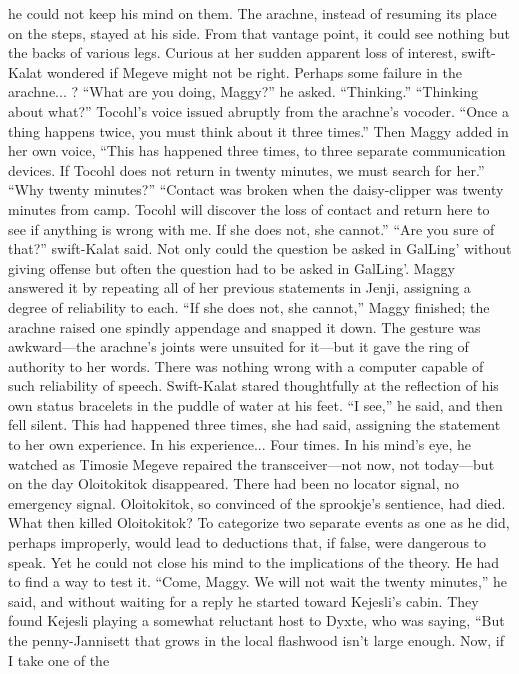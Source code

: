 \documentclass[9pt]{article}
\begin{document}
he could not keep his mind on them. The arachne, instead of resuming its place on the steps, stayed at his
side. From that vantage point, it could see nothing but the backs of various legs.
Curious at her sudden apparent loss of interest, swift-Kalat wondered if Megeve might not be right.
Perhaps some failure in the arachne... ? “What are you doing, Maggy?” he asked.
“Thinking.”
“Thinking about what?”
Tocohl’s voice issued abruptly from the arachne’s vocoder. “Once a thing happens twice, you must
think about it three times.” Then Maggy added in her own voice, “This has happened three times, to
three separate communication devices. If Tocohl does not return in twenty minutes, we must search for
her.”
“Why twenty minutes?”
“Contact was broken when the daisy-clipper was twenty minutes from camp. Tocohl will discover
the loss of contact and return here to see if anything is wrong with me. If she does not, she cannot.”
“Are you sure of that?” swift-Kalat said. Not only could the question be asked in GalLing’ without
giving offense but often the question had to be asked in GalLing’.
Maggy answered it by repeating all of her previous statements in Jenji, assigning a degree of reliability
to each. “If she does not, she cannot,” Maggy finished; the arachne raised one spindly appendage and
snapped it down.
The gesture was awkward—the arachne’s joints were unsuited for it—but it gave the ring of
authority to her words. There was nothing wrong with a computer capable of such reliability of speech.
Swift-Kalat stared thoughtfully at the reflection of his own status bracelets in the puddle of water at
his feet. “I see,” he said, and then fell silent. This had happened three times, she had said, assigning the
statement to her own experience. In his experience...
Four times. In his mind’s eye, he watched as Timosie Megeve repaired the transceiver—not now,
not today—but on the day Oloitokitok disappeared. There had been no locator signal, no emergency
signal. Oloitokitok, so convinced of the sprookje’s sentience, had died. What then killed Oloitokitok?
To categorize two separate events as one as he did, perhaps improperly, would lead to deductions
that, if false, were dangerous to speak. Yet he could not close his mind to the implications of the theory.
He had to find a way to test it.
“Come, Maggy. We will not wait the twenty minutes,” he said, and without waiting for a reply he
started toward Kejesli’s cabin.
They found Kejesli playing a somewhat reluctant host to Dyxte, who was saying, “But the
penny-Jannisett that grows in the local flashwood isn’t large enough. Now, if I take one of the
\end{document}
